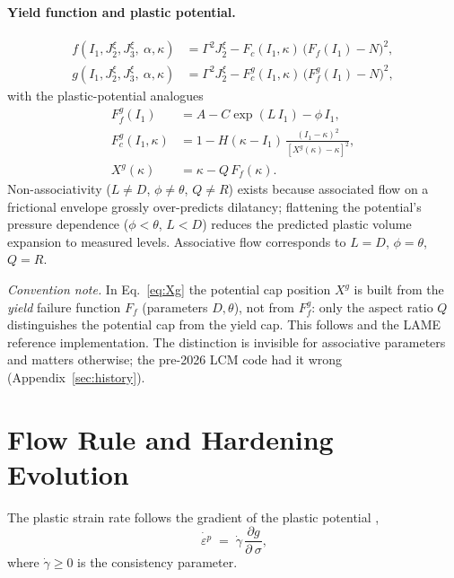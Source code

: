 \documentclass[12pt]{article}
\newcommand{\stress}{~\sigma}
\newcommand{\backstress}{~\alpha}
\newcommand{\pstrain}{{~\varepsilon^p}}
\begin{document}
\paragraph{Yield function and plastic potential.}
\begin{align}
  f(I_1, J_2^\xi, J_3^\xi, \backstress, \kappa)
    &= \Gamma^2 J_2^\xi - F_c(I_1,\kappa)\,\bigl(F_f(I_1) - N\bigr)^2,
    \label{eq:f}\\
  g(I_1, J_2^\xi, J_3^\xi, \backstress, \kappa)
    &= \Gamma^2 J_2^\xi - F_c^g(I_1,\kappa)\,\bigl(F_f^g(I_1) - N\bigr)^2,
    \label{eq:g}
\end{align}
with the plastic-potential analogues
\begin{align}
  F_f^g(I_1)  &= A - C \exp(L\,I_1) - \phi\,I_1, \label{eq:Ffg}\\
  F_c^g(I_1,\kappa) &=
    1 - H(\kappa - I_1)\,\frac{(I_1 - \kappa)^2}{[X^g(\kappa) - \kappa]^2},\\
  X^g(\kappa) &= \kappa - Q\,F_f(\kappa). \label{eq:Xg}
\end{align}
Non-associativity ($L \ne D$, $\phi \ne \theta$, $Q \ne R$) exists
because associated flow on a frictional envelope grossly
over-predicts dilatancy; flattening the potential's pressure
dependence ($\phi < \theta$, $L < D$) reduces the predicted plastic
volume expansion to measured levels. Associative flow corresponds to
$L = D$, $\phi = \theta$, $Q = R$.

\emph{Convention note.} In Eq.~\eqref{eq:Xg} the potential cap
position $X^g$ is built from the \emph{yield} failure function $F_f$
(parameters $D, \theta$), not from $F_f^g$: only the aspect ratio
$Q$ distinguishes the potential cap from the yield cap. This follows
\citet[Eq.~14]{Regueiro.Foster:2011} and the LAME reference
implementation. The distinction is invisible for associative
parameters and matters otherwise; the pre-2026 LCM code had it wrong
(Appendix~\ref{sec:history}).

\section{Flow Rule and Hardening Evolution}
\label{sec:hardening}
\label{sec:flow}

The plastic strain rate follows the gradient of the plastic
potential \citep[Eq.~48]{Sun.Chen.Ostien:2014},
\begin{equation}
  \dot{\pstrain} \;=\; \dot\gamma\,\frac{\partial g}{\partial \stress},
  \label{eq:flow}
\end{equation}
where $\dot\gamma \ge 0$ is the consistency parameter.
\end{document}
